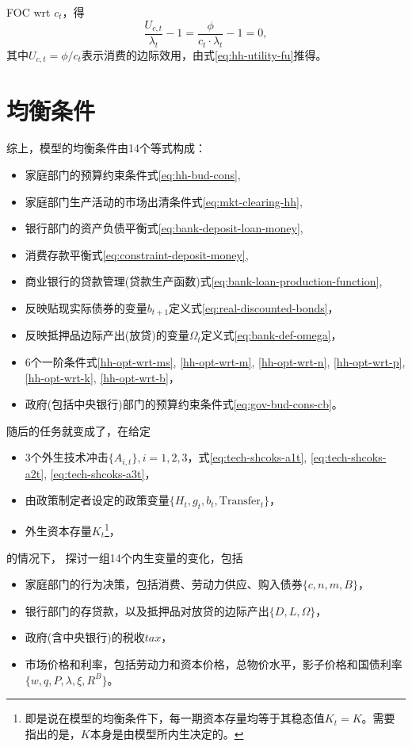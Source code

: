 FOC wrt $c_{t}$，得
\begin{equation}
\label{hh-opt-wrt-c}
\frac{U_{c,t}}{\lambda_t} - 1 = \frac{\phi}{c_t \cdot \lambda_t} - 1 = 0,
\end{equation}
其中$U_{c,t} = \phi/c_t$表示消费的边际效用，由式\eqref{eq:hh-utility-fu}推得。

\section{均衡条件}
\label{sec:banking-equilibra}
综上，模型的均衡条件由14个等式构成：
\begin{itemize}
  \item 家庭部门的预算约束条件式\eqref{eq:hh-bud-cons},
  \item 家庭部门生产活动的市场出清条件式\eqref{eq:mkt-clearing-hh},
  \item 银行部门的资产负债平衡式\eqref{eq:bank-deposit-loan-money},
  \item 消费存款平衡式\eqref{eq:constraint-deposit-money},
  \item 商业银行的贷款管理(贷款生产函数)式\eqref{eq:bank-loan-production-function},
    \item 反映贴现实际债券的变量$b_{t+1}$定义式\eqref{eq:real-discounted-bonds}，
  \item 反映抵押品边际产出(放贷)的变量$\Omega_t$定义式\eqref{eq:bank-def-omega}，
  \item 6个一阶条件式\eqref{hh-opt-wrt-ms}, \eqref{hh-opt-wrt-m}, \eqref{hh-opt-wrt-n}, \eqref{hh-opt-wrt-p}, \eqref{hh-opt-wrt-k}, \eqref{hh-opt-wrt-b}，
  \item 政府(包括中央银行)部门的预算约束条件式\eqref{eq:gov-bud-cons-cb}。
\end{itemize}

随后的任务就变成了，在给定
\begin{itemize}
\item 3个外生技术冲击$\{A_{i,t}\}, i=1,2,3$，式\eqref{eq:tech-shcoks-a1t}, \eqref{eq:tech-shcoks-a2t}, \eqref{eq:tech-shcoks-a3t}，
\item 由政策制定者设定的政策变量$\{H_t, g_t, b_t, \text{Transfer}_{t}\}$，
\item 外生资本存量$K_{t}$\footnote{即是说在模型的均衡条件下，每一期资本存量均等于其稳态值$K_t = K$。需要指出的是，$K$本身是由模型所内生决定的。}，
\end{itemize}

的情况下， 探讨一组14个内生变量的变化，包括
\begin{itemize}
  \item 家庭部门的行为决策，包括消费、劳动力供应、购入债券$\{c, n, m, B\}$，
  \item 银行部门的存贷款，以及抵押品对放贷的边际产出$\{D, L, \Omega\}$，
  \item 政府(含中央银行)的税收$tax$，
  \item 市场价格和利率，包括劳动力和资本价格，总物价水平，影子价格和国债利率$\{w, q, P, \lambda, \xi, R^B \}$。
\end{itemize}

